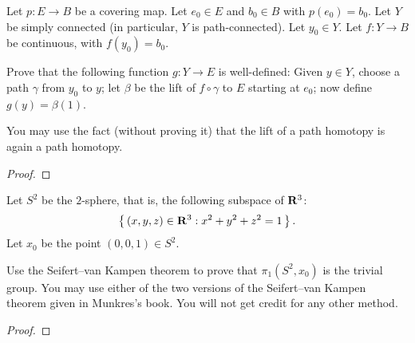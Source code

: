 \begin{problem}
Let $p\colon E\to B$ be a covering map. Let $e_0\in E$ and $b_0\in B$ with
$p(e_0)=b_0$. Let $Y$ be simply connected (in particular, $Y$ is
path-connected). Let $y_0\in Y$. Let $f\colon Y\to B$ be continuous, with
$f(y_0)=b_0$.

Prove that the following function $g\colon Y\to E$ is well-defined: Given
$y\in Y$, choose a path $\gamma$ from $y_0$ to $y$; let $\beta$ be the lift
of $f\circ\gamma$ to $E$ starting at $e_0$; now define $g(y)=\beta(1)$.

You may use the fact (without proving it) that the lift of a path homotopy
is again a path homotopy.
\end{problem}
\begin{proof}
\end{proof}

\begin{problem}
Let $S^2$ be the $2$-sphere, that is, the following subspace of $\mathbf{R}^3$:
\[
\left\{\,(x,y,z)\in\mathbf{R}^3:x^2+y^2+z^2=1\,\right\}.
\]
Let $x_0$ be the point $(0,0,1)\in S^2$.

Use the Seifert--van Kampen theorem to prove that $\pi_1(S^2,x_0)$ is the
trivial group. You may use either of the two versions of the Seifert--van
Kampen theorem given in Munkres's book. You will not get credit for any
other method.
\end{problem}
\begin{proof}
\end{proof}

